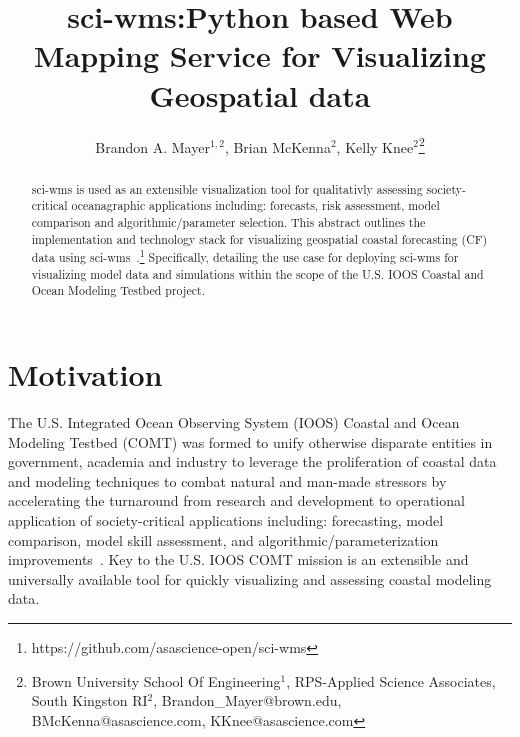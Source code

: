 \documentclass[11pt,twocolumn,twoside]{IEEEtran}
\newcommand{\comt}{COMT}
\newcommand{\ioos}{IOOS}
\newcommand{\sciwms}{sci-wms}
\begin{document}
\title{\vspace{0.2in}\sc sci-wms:Python based Web Mapping Service for Visualizing Geospatial data}

\author{Brandon A. Mayer$^{1,2}$, Brian McKenna$^{2}$, Kelly Knee$^{2}$\thanks{Brown University School Of Engineering$^{1}$, RPS-Applied Science Associates, South Kingston RI$^{2}$, Brandon\_Mayer@brown.edu, BMcKenna@asascience.com, KKnee@asascience.com}}

\maketitle
\thispagestyle{fancy}

\begin{abstract}
\sciwms{} is used as an extensible visualization tool for qualitativly
assessing society-critical oceanagraphic applications including:
forecasts, risk assessment, model comparison and algorithmic/parameter
selection. This abstract outlines the implementation and technology
stack for visualizing geospatial coastal forecasting (CF) data using
sci-wms~\cite{wms14}.\footnote{https://github.com/asascience-open/sci-wms}
Specifically, detailing the use case for deploying \sciwms{} for visualizing
model data and simulations within the scope of the U.S. \ioos{} Coastal
and Ocean Modeling Testbed project.~\cite{luettich13}
\end{abstract}

\section{Motivation}
The U.S. Integrated Ocean Observing System (\ioos{}) Coastal and Ocean
Modeling Testbed (\comt{}) was formed to unify otherwise disparate
entities in government, academia and industry to leverage the
proliferation of coastal data and modeling techniques to combat
natural and man-made stressors by accelerating the turnaround from
research and development to operational application of
society-critical applications including: forecasting, model comparison,
model skill assessment, and algorithmic/parameterization
improvements~\cite{luettich13}. Key to the U.S. \ioos{} \comt{}
mission is an extensible and universally available tool for quickly
visualizing and assessing coastal modeling data.
\end{document}
